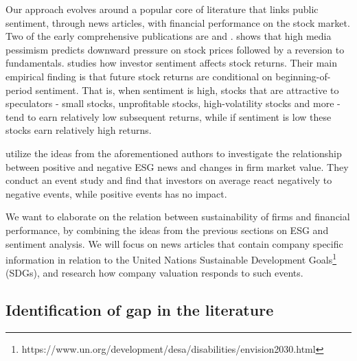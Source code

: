 Our approach evolves around a popular core of literature that links public sentiment, through news articles, with financial performance on the stock market. Two of the early comprehensive publications are \cite{tetlock_sentiment} and \cite{baker_sentiment}. \citeauthor{tetlock_sentiment} shows that high media pessimism predicts downward pressure on stock prices followed by a reversion to fundamentals. \citeauthor{baker_sentiment} studies how investor sentiment affects stock returns. Their main empirical finding is that future stock returns are conditional on beginning-of-period sentiment. That is, when sentiment is high, stocks that are attractive to speculators - small stocks, unprofitable stocks, high-volatility stocks and more - tend to earn relatively low subsequent returns, while if sentiment is low these stocks earn relatively high returns.   

\cite{Blancard_ESG_sentiment} utilize the ideas from the aforementioned authors to investigate the relationship between positive and negative ESG news and changes in firm market value. They conduct an event study and find that investors on average react negatively to negative events, while positive events has no impact. 

We want to elaborate on the relation between sustainability of firms and financial performance, by combining the ideas from the previous sections on ESG and sentiment analysis. We will focus on news articles that contain company specific information in relation to the United Nations Sustainable Development Goals\footnote{https://www.un.org/development/desa/disabilities/envision2030.html} (SDGs), and research how company valuation responds to such events. 



\subsection{Identification of gap in the literature}


